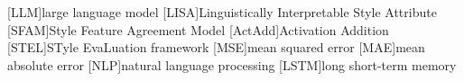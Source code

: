 
\begin{acronym}[ActAdd] %
  [LLM]{large language model}
  [LISA]{Linguistically Interpretable Style Attribute}
  [SFAM]{Style Feature Agreement Model}
  [ActAdd]{Activation Addition}
  [STEL]{STyle EvaLuation framework}
  [MSE]{mean squared error}
  [MAE]{mean absolute error}
  [NLP]{natural language processing}
  [LSTM]{long short-term memory}
\end{acronym}